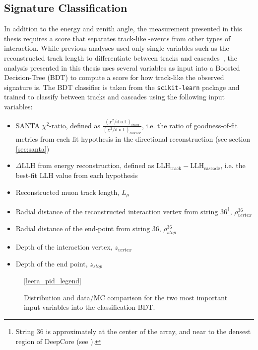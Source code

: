 \subsection{Signature Classification}
\label{sec:pid}
In addition to the energy and zenith angle, the measurement presented in this thesis requires a score that separates track-like \numucc-events from other types of interaction.
While previous analyses used only single variables such as the reconstructed track length to differentiate between tracks and cascades~\cite{deepcore_sterile_2017, Aartsen_2015,IceCube:2019dqi}, the analysis presented in this thesis uses several variables as input into a Boosted Decision-Tree (BDT) to compute a score for how track-like the observed signature is.
The BDT classifier is taken from the \texttt{scikit-learn}\cite{scikit-learn} package and trained to classify between tracks and cascades using the following input variables:
\begin{itemize}
    \item SANTA $\chi^2\textrm{-ratio}$, defined as  $\frac{(\chi^{2}/\mathrm{d.o.f.})_{\mathrm{track}}}{(\chi^{2}/\mathrm{d.o.f.})_{\mathrm{cascade}}}$, i.e.
the ratio of goodness-of-fit metrics from each fit hypothesis in the directional reconstruction (see section \ref{sec:santa})
    \item $\Delta$LLH from energy reconstruction, defined as LLH$_\mathrm{track}-$LLH$_\mathrm{cascade}$, i.e.
the best-fit LLH value from each hypothesis
    \item Reconstructed muon track length, $L_{\mu}$
    \item Radial distance of the reconstructed interaction vertex from string 36\footnote{String 36 is approximately at the center of the array, and near to the densest region of DeepCore (see ).}, $\rho^{36}_{vertex}$
    \item Radial distance of the end-point from string 36, $\rho^{36}_{stop}$
    \item Depth of the interaction vertex, $z_{vertex}$
    \item Depth of the end point, $z_{stop}$
\end{itemize}
\begin{figure}
    \centering
    \ref{leera_pid_legend}


    
    
    \caption{Distribution and data/MC comparison for the two most important input variables into the classification BDT.}
    \label{fig:bdt-input-vars}
\end{figure}
